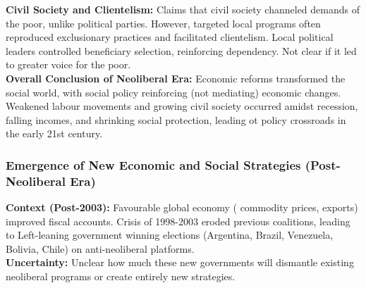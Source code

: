 \documentclass{article}
\begin{document}
    \noindent \textbf{Civil Society and Clientelism:} Claims that civil
society channeled demands of the poor, unlike political parties. However,
targeted local programs often reproduced exclusionary practices and
facilitated clientelism. Local political leaders controlled beneficiary
selection, reinforcing dependency. Not clear if it led to greater voice for
the poor.\\

    \noindent \textbf{Overall Conclusion of Neoliberal Era:} Economic
reforms transformed the social world, with social policy reinforcing (not
mediating) economic changes. Weakened labour movements and growing civil
society occurred amidst recession, falling incomes, and shrinking social
protection, leading ot policy crossroads in the early 21st century.

    \subsubsection{Emergence of New Economic and Social Strategies (Post-Neoliberal Era)}

    \noindent \textbf{Context (Post-2003):} Favourable global economy (
commodity prices, exports) improved fiscal accounts. Crisis of 1998-2003
eroded previous coalitions, leading to Left-leaning government winning
elections (Argentina, Brazil, Venezuela, Bolivia, Chile) on anti-neoliberal
platforms.\\

    \noindent \textbf{Uncertainty:} Unclear how much these new governments
will dismantle existing neoliberal programs or create entirely new strategies.\\
\end{document}
